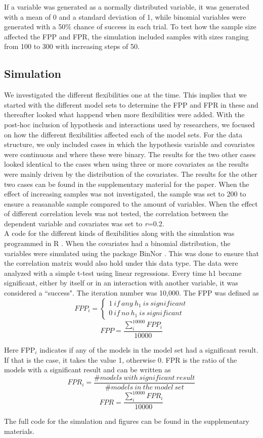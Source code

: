 If a variable was generated as a normally distributed variable, it was generated with a mean of 0 and a standard deviation of 1, while binomial variables were generated with a 50\% chance of success in each trial. To test how the sample size affected the FPP and FPR, the simulation included samples with sizes ranging from 100 to 300 with increasing steps of 50. 

\subsection{Simulation}
We investigated the different flexibilities one at the time. This implies that we started with the different model sets to determine the FPP and FPR in these and thereafter looked what happend when more flexibilities were added. With the post-hoc inclusion of hypothesis and interactions used by researchers, we focused on how the different flexibilities affected each of the model sets. For the data structure, we only included cases in which the hypothesis variable and covariates were continuous and where these were binary. The results for the two other cases looked identical to the cases when using three or more covariates as the results were mainly driven by the distribution of the covariates. The results for the other two cases can be found in the supplementary material for the paper. When the effect of increasing samples was not investigated, the sample was set to 200 to ensure a reasanable sample compared to the amount of variables. When the effect of different correlation levels was not tested, the correlation between the dependent variable and covariates was set to \textit{r}=0.2.\\

A code for the different kinds of flexibilities along with the simulation was programmed in R \citep{Team2018}. When the covariates had a binomial distribution, the variables were simulated using the package BinNor \citep{Demirtas2014}. This was done to ensure that the correlation matrix would also hold under this data type. The data were analyzed with a simple t-test using linear regressions. Every time h1 became significant, either by itself or in an interaction with another variable, it was considered a “success". The iteration number was 10,000. The FPP was defined as \\

\[FPP_i=\left. \left\{\begin{array}{c}
1\ if\ any\ h_1\ is\ significant \\ 
0\ if\ no\ h_1\ is\ significant\  \end{array}
\right.\] 
\[FPP=\frac{\sum^{10000}_i{FPP_i}}{10000}\] 


Here FPP${}_{i}$ indicates if any of the models in the model set had a significant result. If that is the case, it takes the value 1, otherwise 0. FPR is the ratio of the models with a significant result and can be written as \\

\[FPR_i=\frac{\#models\ with\ significant\ result}{\#models\ in\ the\ model\ set}\] 
\[FPR=\frac{\sum^{10000}_i{FPR_i}}{10000}\] 


The full code for the simulation and figures can be found in the supplementary materials. 

